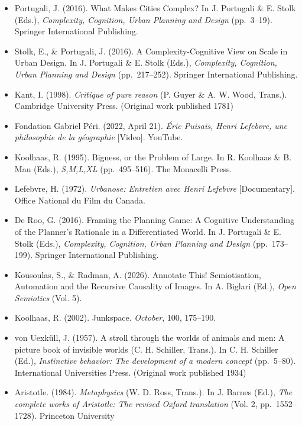 \documentclass[
  letterpaper,
  DIV=11,
  numbers=noendperiod]{scrreprt}
\providecommand{\tightlist}{%
  \setlength{\itemsep}{0pt}\setlength{\parskip}{0pt}}
\begin{document}
\begin{itemize}
\tightlist
\item
  Portugali, J. (2016). What Makes Cities Complex? In J. Portugali \& E.
  Stolk (Eds.), \emph{Complexity, Cognition, Urban Planning and Design}
  (pp.~3--19). Springer International Publishing.
\item
  Stolk, E., \& Portugali, J. (2016). A Complexity-Cognitive View on
  Scale in Urban Design. In J. Portugali \& E. Stolk (Eds.),
  \emph{Complexity, Cognition, Urban Planning and Design}
  (pp.~217--252). Springer International Publishing.
\item
  Kant, I. (1998). \emph{Critique of pure reason} (P. Guyer \& A. W.
  Wood, Trans.). Cambridge University Press. (Original work published
  1781)
\item
  Fondation Gabriel Péri. (2022, April 21). \emph{Éric Puisais, Henri
  Lefebvre, une philosophie de la géographie} {[}Video{]}. YouTube.
\item
  Koolhaas, R. (1995). Bigness, or the Problem of Large. In R. Koolhaas
  \& B. Mau (Eds.), \emph{S,M,L,XL} (pp.~495--516). The Monacelli Press.
\item
  Lefebvre, H. (1972). \emph{Urbanose: Entretien avec Henri Lefebvre}
  {[}Documentary{]}. Office National du Film du Canada.
\item
  De Roo, G. (2016). Framing the Planning Game: A Cognitive
  Understanding of the Planner's Rationale in a Differentiated World. In
  J. Portugali \& E. Stolk (Eds.), \emph{Complexity, Cognition, Urban
  Planning and Design} (pp.~173--199). Springer International
  Publishing.
\item
  Kousoulas, S., \& Radman, A. (2026). Annotate This! Semiotisation,
  Automation and the Recursive Causality of Images. In A. Biglari (Ed.),
  \emph{Open Semiotics} (Vol. 5).
\item
  Koolhaas, R. (2002). Junkspace. \emph{October}, 100, 175--190.
\item
  von Uexküll, J. (1957). A stroll through the worlds of animals and
  men: A picture book of invisible worlds (C. H. Schiller, Trans.). In
  C. H. Schiller (Ed.), \emph{Instinctive behavior: The development of a
  modern concept} (pp.~5--80). International Universities Press.
  (Original work published 1934)
\item
  Aristotle. (1984). \emph{Metaphysics} (W. D. Ross, Trans.). In J.
  Barnes (Ed.), \emph{The complete works of Aristotle: The revised
  Oxford translation} (Vol. 2, pp.~1552--1728). Princeton University

\end{itemize}
\end{document}
